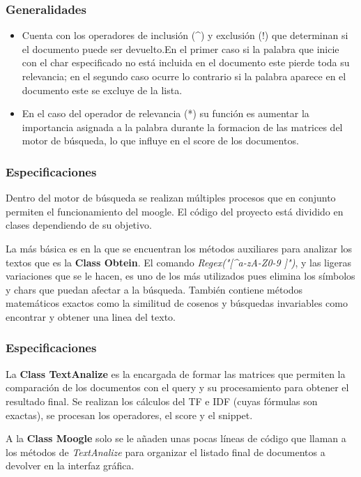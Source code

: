 \documentclass{beamer}
\begin{document}
\begin{frame}
    \frametitle{Generalidades}
    \begin{itemize}
        \item Cuenta con los operadores de inclusión (\^{}) y exclusión (!) que determinan si el documento puede ser 
        devuelto.En el primer caso si la palabra que inicie con el char especificado no está incluida en el documento 
        este pierde toda su relevancia; en el segundo caso ocurre lo contrario si la palabra aparece en el documento 
        este se excluye de la lista.
        \item En el caso del operador de relevancia (*) su función es aumentar la importancia asignada a la palabra 
        durante la formacion de las matrices del motor de búsqueda, lo que influye en el score de los documentos.
    \end{itemize}
\end{frame}

\begin{frame}
    \frametitle{Especificaciones}
    Dentro del motor de búsqueda se realizan múltiples procesos que en conjunto permiten el funcionamiento del moogle.
    El código del proyecto está dividido en clases dependiendo de su objetivo. 
    
    La más básica es en la que se encuentran los métodos auxiliares para analizar los textos que es la 
    \textbf{Class Obtein}. El comando \textit{Regex("[\^{}a-zA-Z0-9 ]")}, y las ligeras variaciones que se le hacen, 
    es uno de los más utilizados pues elimina los símbolos y chars que puedan afectar a la búsqueda. También contiene 
    métodos matemáticos exactos como la similitud de cosenos y búsquedas invariables como encontrar y obtener una 
    linea del texto.
\end{frame}

\begin{frame} 
    \frametitle{Especificaciones}
    La \textbf{Class TextAnalize} es la encargada de formar las matrices que permiten la comparación de los documentos
    con el query y su procesamiento para obtener el resultado final. Se realizan los cálculos del TF e IDF (cuyas 
    fórmulas son exactas), se procesan los operadores, el score y el snippet.

    A la \textbf{Class Moogle} solo se le añaden unas pocas líneas de código que llaman a los métodos de 
    \textit{TextAnalize} para organizar el listado final de documentos a devolver en la interfaz gráfica.
\end{frame}
\end{document}
